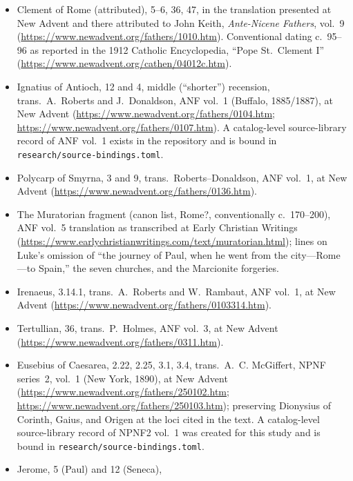 \begin{itemize}
\item Clement of Rome (attributed),  5--6, 36, 47, in the translation presented at New Advent and
there attributed to John Keith, \textit{Ante-Nicene Fathers}, vol.~9
(\url{https://www.newadvent.org/fathers/1010.htm}). Conventional dating
c.~95--96 as reported in the 1912 Catholic Encyclopedia, ``Pope
St.~Clement I'' (\url{https://www.newadvent.org/cathen/04012c.htm}).
\item Ignatius of Antioch,  12 and
 4, middle (``shorter'') recension, trans.\
A.~Roberts and J.~Donaldson, ANF vol.~1 (Buffalo, 1885/1887), at New
Advent (\url{https://www.newadvent.org/fathers/0104.htm};
\url{https://www.newadvent.org/fathers/0107.htm}). A catalog-level
source-library record of ANF vol.~1 exists in the repository and is bound
in \texttt{research/source-bindings.toml}.
\item Polycarp of Smyrna,  3 and 9,
trans.\ Roberts--Donaldson, ANF vol.~1, at New Advent
(\url{https://www.newadvent.org/fathers/0136.htm}).
\item The Muratorian fragment (canon list, Rome?, conventionally
c.~170--200), ANF vol.~5 translation as transcribed at Early Christian
Writings (\url{https://www.earlychristianwritings.com/text/muratorian.html});
lines on Luke's omission of ``the journey of Paul, when he went from the
city---Rome---to Spain,'' the seven churches, and the Marcionite
forgeries.
\item Irenaeus,  3.14.1, trans.\
A.~Roberts and W.~Rambaut, ANF vol.~1, at New Advent
(\url{https://www.newadvent.org/fathers/0103314.htm}).
\item Tertullian,  36, trans.\
P.~Holmes, ANF vol.~3, at New Advent
(\url{https://www.newadvent.org/fathers/0311.htm}).
\item Eusebius of Caesarea, \work{Church History} 2.22, 2.25, 3.1, 3.4,
trans.\ A.~C. McGiffert, NPNF series~2, vol.~1 (New York, 1890), at New
Advent (\url{https://www.newadvent.org/fathers/250102.htm};
\url{https://www.newadvent.org/fathers/250103.htm}); preserving Dionysius
of Corinth, Gaius, and Origen at the loci cited in the text. A
catalog-level source-library record of NPNF2 vol.~1 was created for this
study and is bound in \texttt{research/source-bindings.toml}.
\item Jerome, \work{De viris illustribus} 5 (Paul) and 12 (Seneca),

\end{itemize}
